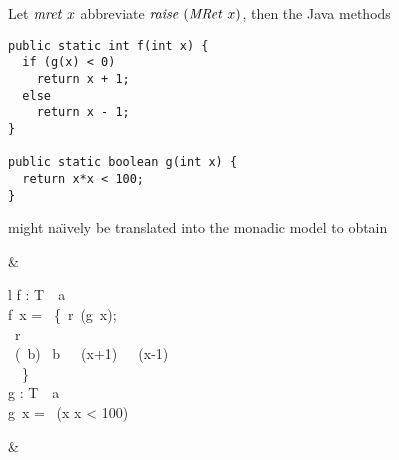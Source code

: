\begin{expl} \label{ex:java-to-monad} Let $\mathit{mret}\ x$ abbreviate $\mathit{raise}\
  (\mathit{MRet}\ x)$, then the Java methods
\begin{verbatim}
public static int f(int x) {
  if (g(x) < 0)
    return x + 1;
  else
    return x - 1;
}

public static boolean g(int x) {
  return x*x < 100;
}
\end{verbatim}
might na\"\i vely be translated into the monadic model  to obtain
{
  \newcommand{\filla}{\hspace*{1.8cm}}
  \newcommand{\fillaa}{\hspace*{2.5cm}}
  \begin{flalign*}
    & 
    \begin{array}{l}
         f :  \to T\ \ a \\
         f\ x = \DO\ \{\ r \catchEx\ (g~x);\\
         \filla \Case\ r\ \Of\\
         \fillaa \inl~(~b) \to \If\ b\ \Then\ ~(x+1)\ \Else\
         ~(x-1)\\
         \fillaa \Arg \quad \to \raiseEx\ \op{Error}\ \}\\[2ex]
         g : \Type{Int} \to T\ \Omega\ a\\
         g\ x = \op{mret}\ (x \cdot x < 100)
    \end{array} & \mbox{}
  \end{flalign*}
}


\end{expl}

